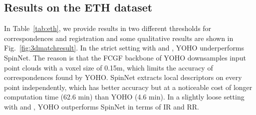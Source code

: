 \begin{table}[]
\begin{center}
\end{center}
\caption{RR on the ETH dataset with ICP. T is the total time for the registration, including the time used in ICP.}
\label{tab:ethicp}
\vspace{-20pt}
\end{table}


\subsection{Results on the ETH dataset}
\label{sec:maineth}

In Table~\ref{tab:eth}, we provide results in two different thresholds for correspondences and registration and some qualitative results are shown in Fig.~\ref{fig:3dmatchresult}. In the strict setting with  and , YOHO underperforms SpinNet. The reason is that the FCGF backbone of YOHO downsamples input point clouds with a voxel size of 0.15m, which limits the accuracy of correspondences found by YOHO. SpinNet extracts local descriptors on every point independently, which has better accuracy but at a noticeable cost of longer computation time (62.6 min) than YOHO (4.6 min). In a slightly loose setting with  and , YOHO outperforms SpinNet in terms of IR and RR. 

